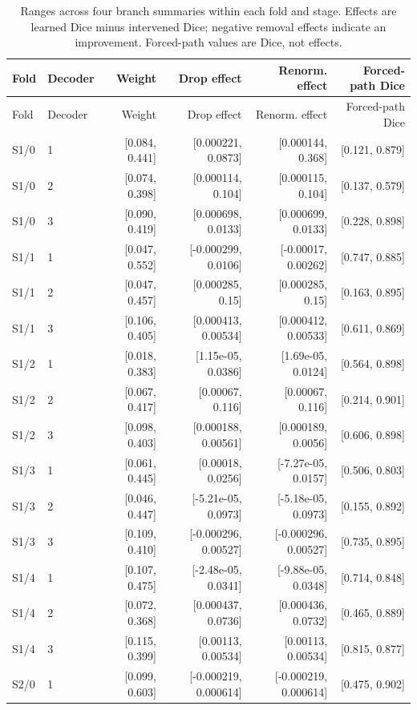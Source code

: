 \begin{longtable}{llrrrr}
\caption{Ranges across four branch summaries within each fold and stage. Effects are learned Dice minus intervened Dice; negative removal effects indicate an improvement. Forced-path values are Dice, not effects.}\label{tab:ranges}\\
\toprule
Fold & Decoder & Weight & Drop effect & Renorm. effect & Forced-path Dice \\
\midrule
\endfirsthead
\toprule
Fold & Decoder & Weight & Drop effect & Renorm. effect & Forced-path Dice \\
\midrule
\endhead
\midrule
\endfoot
\bottomrule
\endlastfoot
S1/0 & 1 & [0.084, 0.441] & [0.000221, 0.0873] & [0.000144, 0.368] & [0.121, 0.879] \\
S1/0 & 2 & [0.074, 0.398] & [0.000114, 0.104] & [0.000115, 0.104] & [0.137, 0.579] \\
S1/0 & 3 & [0.090, 0.419] & [0.000698, 0.0133] & [0.000699, 0.0133] & [0.228, 0.898] \\
S1/1 & 1 & [0.047, 0.552] & [-0.000299, 0.0106] & [-0.00017, 0.00262] & [0.747, 0.885] \\
S1/1 & 2 & [0.047, 0.457] & [0.000285, 0.15] & [0.000285, 0.15] & [0.163, 0.895] \\
S1/1 & 3 & [0.106, 0.405] & [0.000413, 0.00534] & [0.000412, 0.00533] & [0.611, 0.869] \\
S1/2 & 1 & [0.018, 0.383] & [1.15e-05, 0.0386] & [1.69e-05, 0.0124] & [0.564, 0.898] \\
S1/2 & 2 & [0.067, 0.417] & [0.00067, 0.116] & [0.00067, 0.116] & [0.214, 0.901] \\
S1/2 & 3 & [0.098, 0.403] & [0.000188, 0.00561] & [0.000189, 0.0056] & [0.606, 0.898] \\
S1/3 & 1 & [0.061, 0.445] & [0.00018, 0.0256] & [-7.27e-05, 0.0157] & [0.506, 0.803] \\
S1/3 & 2 & [0.046, 0.447] & [-5.21e-05, 0.0973] & [-5.18e-05, 0.0973] & [0.155, 0.892] \\
S1/3 & 3 & [0.109, 0.410] & [-0.000296, 0.00527] & [-0.000296, 0.00527] & [0.735, 0.895] \\
S1/4 & 1 & [0.107, 0.475] & [-2.48e-05, 0.0341] & [-9.88e-05, 0.0348] & [0.714, 0.848] \\
S1/4 & 2 & [0.072, 0.368] & [0.000437, 0.0736] & [0.000436, 0.0732] & [0.465, 0.889] \\
S1/4 & 3 & [0.115, 0.399] & [0.00113, 0.00534] & [0.00113, 0.00534] & [0.815, 0.877] \\
S2/0 & 1 & [0.099, 0.603] & [-0.000219, 0.000614] & [-0.000219, 0.000614] & [0.475, 0.902] \\

\end{longtable}
